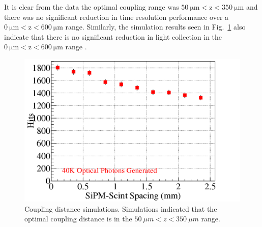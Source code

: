It is clear from the data the optimal coupling range was $\mathrm{50\ \mu m < z < 350\ \mu m}$ and there was no significant reduction in time resolution performance over a $\mathrm{0\ \mu m < z < 600\ \mu m}$ range.  Similarly, the simulation results seen in Fig.~\ref{fig:spacing_sim} also indicate that there is no significant reduction in light collection in the $\mathrm{0\ \mu m < z < 600\ \mu m}$ range \cite{puneet_sim_talk}.
	\begin{figure}[!htb]
		\centering
		\includegraphics[width=1.0\columnwidth]{misalignment/figs/spacing_sim}
		\caption{Coupling distance simulations. Simulations indicated that the optimal coupling distance is in the $50\ \mu m < z < 350\ \mu m$ range.}
		\label{fig:spacing_sim}
	\end{figure}

%

